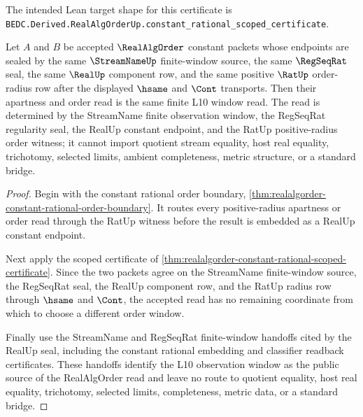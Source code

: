 The intended Lean target shape for this certificate is
\texttt{BEDC.Derived.RealAlgOrderUp.constant\_rational\_scoped\_certificate}.

\begin{theorem}
\label{thm:real-alg-order-positive-radius-window-stability}
Let $A$ and $B$ be accepted $\RealAlgOrder$ constant packets whose endpoints
are sealed by the same $\StreamNameUp$ finite-window source, the same
$\RegSeqRat$ seal, the same $\RealUp$ component row, and the same positive
$\RatUp$ order-radius row after the displayed $\hsame$ and $\Cont$ transports.
Then their apartness and order read is the same finite L10 window read. The
read is determined by the StreamName finite observation window, the RegSeqRat
regularity seal, the RealUp constant endpoint, and the RatUp positive-radius
order witness; it cannot import quotient stream equality, host real equality,
trichotomy, selected limits, ambient completeness, metric structure, or a
standard bridge.
\end{theorem}
\begin{proof}
Begin with the constant rational order boundary,
\autoref{thm:realalgorder-constant-rational-order-boundary}. It routes every
positive-radius apartness or order read through the RatUp witness before the
result is embedded as a RealUp constant endpoint.

Next apply the scoped certificate of
\autoref{thm:realalgorder-constant-rational-scoped-certificate}. Since the two
packets agree on the StreamName finite-window source, the RegSeqRat seal, the
RealUp component row, and the RatUp radius row through $\hsame$ and $\Cont$,
the accepted read has no remaining coordinate from which to choose a different
order window.

Finally use the StreamName and RegSeqRat finite-window handoffs cited by the
RealUp seal, including the constant rational embedding and classifier readback
certificates. These handoffs identify the L10 observation window as the public
source of the RealAlgOrder read and leave no route to quotient equality, host
real equality, trichotomy, selected limits, completeness, metric data, or a
standard bridge.
\end{proof}


